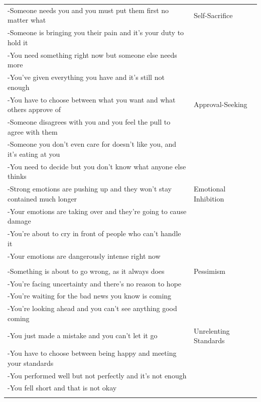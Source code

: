 \documentclass[11pt,oneside]{book}
\begin{document}
\begin{longtable}{>{\raggedright\arraybackslash}p{} >{\raggedright\arraybackslash}p{}}
-Someone needs you and you must put them first no matter what & Self-Sacrifice \\
-Someone is bringing you their pain and it's your duty to hold it &  \\
-You need something right now but someone else needs more &  \\
-You've given everything you have and it's still not enough &  \\
\addlinespace

-You have to choose between what you want and what others approve of & Approval-Seeking \\
-Someone disagrees with you and you feel the pull to agree with them &  \\
-Someone you don't even care for doesn't like you, and it's eating at you &  \\
-You need to decide but you don't know what anyone else thinks &  \\
\addlinespace

-Strong emotions are pushing up and they won't stay contained much longer & Emotional Inhibition \\
-Your emotions are taking over and they're going to cause damage &  \\
-You're about to cry in front of people who can't handle it &  \\
-Your emotions are dangerously intense right now &  \\

\midrule
\multicolumn{2}{l}{\textbf{Spontaneity \& Play}} \\
\midrule

-Something is about to go wrong, as it always does & Pessimism \\
-You're facing uncertainty and there's no reason to hope &  \\
-You're waiting for the bad news you know is coming &  \\
-You're looking ahead and you can't see anything good coming &  \\
\addlinespace

-You just made a mistake and you can't let it go & Unrelenting Standards \\
-You have to choose between being happy and meeting your standards &  \\
-You performed well but not perfectly and it's not enough &  \\
-You fell short and that is not okay &  \\
\addlinespace


\end{longtable}
\end{document}
